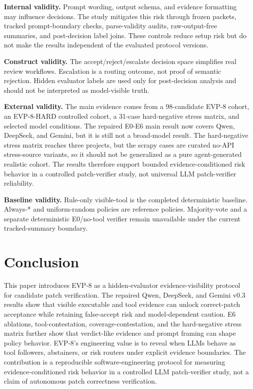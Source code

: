 \documentclass[conference]{IEEEtran}
\begin{document}
\textbf{Internal validity.} Prompt wording, output schema, and evidence formatting may influence decisions. The study mitigates this risk through frozen packets, tracked prompt-boundary checks, parse-validity audits, raw-output-free summaries, and post-decision label joins. These controls reduce setup risk but do not make the results independent of the evaluated protocol versions.

\textbf{Construct validity.} The accept/reject/escalate decision space simplifies real review workflows. Escalation is a routing outcome, not proof of semantic rejection. Hidden evaluator labels are used only for post-decision analysis and should not be interpreted as model-visible truth.

\textbf{External validity.} The main evidence comes from a 98-candidate EVP-8 cohort, an EVP-8-HARD controlled cohort, a 31-case hard-negative stress matrix, and selected model conditions. The repaired E0-E6 main result now covers Qwen, DeepSeek, and Gemini, but it is still not a broad-model result. The hard-negative stress matrix reaches three projects, but the scrapy cases are curated no-API stress-source variants, so it should not be generalized as a pure agent-generated realistic cohort. The results therefore support bounded evidence-conditioned risk behavior in a controlled patch-verifier study, not universal LLM patch-verifier reliability.

\textbf{Baseline validity.} Rule-only visible-tool is the completed deterministic baseline. Always-* and uniform-random policies are reference policies. Majority-vote and a separate deterministic E0/no-tool verifier remain unavailable under the current tracked-summary boundary.

\section{Conclusion}

This paper introduces EVP-8 as a hidden-evaluator evidence-visibility protocol for candidate patch verification. The repaired Qwen, DeepSeek, and Gemini v0.3 results show that visible executable and tool evidence can unlock correct-patch acceptance while retaining false-accept risk and model-dependent caution. E6 ablations, tool-contestation, coverage-contestation, and the hard-negative stress matrix further show that verdict-like evidence and prompt framing can shape policy behavior. EVP-8's engineering value is to reveal when LLMs behave as tool followers, abstainers, or risk routers under explicit evidence boundaries. The contribution is a reproducible software-engineering protocol for measuring evidence-conditioned risk behavior in a controlled LLM patch-verifier study, not a claim of autonomous patch correctness verification.




\end{document}
